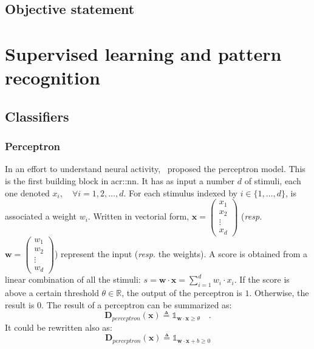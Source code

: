     \subsection{Objective statement}
\section{Supervised learning and pattern recognition}
    \subsection{Classifiers}
        \subsubsection{Perceptron}
            In an effort to understand neural activity,~\textcite{rosenblatt1958perceptron} proposed the perceptron model.
            This is the first building block in \gls{acr::nn}.
            It has as input a number $d$ of stimuli, each one denoted $x_i,\quad \forall i = 1,2,\dots,d$.
            For each stimulus indexed by $i\in \{1,\dots,d\}$, is associated a weight $w_i$.
            Written in vectorial form, $\bm{x} = \begin{pmatrix}x_1\\ x_2\\ \vdots \\ x_d \end{pmatrix}$ (\textit{resp.} $\bm{w} = \begin{pmatrix}w_1\\ w_2\\ \vdots \\w_d \end{pmatrix}$) represent the input (\textit{resp.} the weights).
            A score is obtained from a linear combination of all the stimuli: $s = \bm{w} \cdot \bm{x} = \sum_{i=1}^{d} w_i \cdot x_i$.
            If the score is above a certain threshold $\theta \in \mathbb{R}$, the output of the perceptron is $1$.
            Otherwise, the result is $0$.
            The result of a perceptron can be summarized as:
            \begin{equation}
                \label{eq::perceptron}
                \mathbf{D}_{perceptron}(\bm{x}) \triangleq \mathbb{1}_{\bm{w} \cdot \bm{x} \geq \theta} \quad.
            \end{equation}
            It could be rewritten also as:
            \begin{equation}
                \label{eq::perceptron_is_linear}
                \mathbf{D}_{perceptron}(\bm{x}) \triangleq \mathbb{1}_{\bm{w} \cdot \bm{x} + b \geq 0}
            \end{equation}

